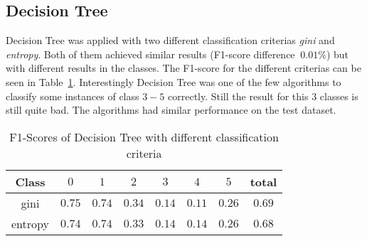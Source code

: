 \subsection{Decision Tree}
Decision Tree was applied with two different classification criterias \textit{gini} and \textit{entropy}. Both of them achieved similar results (F1-score difference $~0.01\%$) but with different results in the classes. The F1-score for the different criterias can be seen in Table~\ref{ds2:table:dtf1}. Interestingly Decision Tree was one of the few algorithms to classify some instances of class $3-5$ correctly. Still the result for this $3$ classes is still quite bad. The algorithms had similar performance on the test dataset.
\begin{table}[p]
	\begin{center}
		\begin{tabular}{|c|c|c|c|c|c|c|c|}
\hline Class & $0$ & $1$ & $2$ & $3$ &$4$  &$ 5$ & total \\
\hline gini & $0.75$ &$0.74$ &$0.34$ &$0.14$&$0.11$&$0.26$&$0.69$\\
\hline entropy & $0.74$&$0.74$&$0.33$&$0.14$&$0.14$&$0.26$&$0.68$\\
\hline
	\end{tabular}


	\end{center}
	\caption{F1-Scores of Decision Tree with different classification criteria\label{ds2:table:dtf1}}
\end{table}

